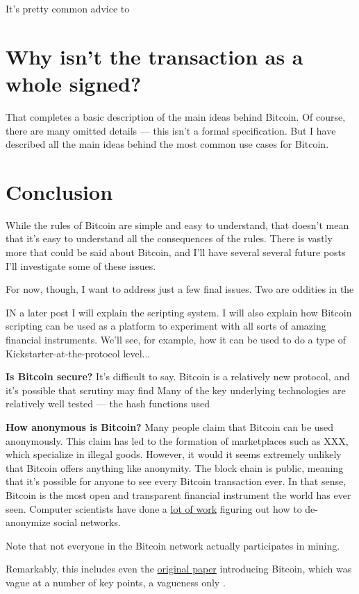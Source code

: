 \documentclass[12pt]{book}
\newcommand{\link}[2]{\href{#1}{#2}}
\newcounter{example}[chapter]
\begin{document}
It's pretty common advice to  

\section{Why isn't the transaction as a whole signed?}


That completes a basic description of the main ideas behind Bitcoin.
Of course, there are many omitted details --- this isn't a formal
specification.  But I have described all the main ideas behind the
most common use cases for Bitcoin.

\section{Conclusion}

While the rules of Bitcoin are simple and easy to understand, that
doesn't mean that it's easy to understand all the consequences of the
rules.  There is vastly more that could be said about Bitcoin, and
I'll have several several future posts I'll investigate some of these
issues.

For now, though, I want to address just a few final issues.  Two are
oddities in the 

IN a later post I will explain the scripting system.  I will also
explain how Bitcoin scripting can be used as a platform to experiment
with all sorts of amazing financial instruments.  We'll see, for
example, how it can be used to do a type of
Kickstarter-at-the-protocol level...

\textbf{Is Bitcoin secure?}  It's difficult to say.  Bitcoin is a
relatively new protocol, and it's possible that scrutiny may find Many
of the key underlying technologies are relatively well tested --- the
hash functions used

\textbf{How anonymous is Bitcoin?} Many people claim that Bitcoin can
be used anonymously.  This claim has led to the formation of
marketplaces such as XXX, which specialize in illegal goods.  However,
it would it seems extremely unlikely that Bitcoin offers anything like
anonymity.  The block chain is public, meaning that it's possible for
anyone to see every Bitcoin transaction ever.  In that sense, Bitcoin
is the most open and transparent financial instrument the world has
ever seen.  Computer scientists have done a
\link{http://scholar.google.com/scholar?q=de-anonymization}{lot of
  work} figuring out how to de-anonymize social networks.





Note that not everyone in the Bitcoin network actually participates in
mining.


Remarkably, this includes even the
\link{http://bitcoin.org/bitcoin.pdf}{original paper} introducing
Bitcoin, which was vague at a number of key points, a vagueness only .
\end{document}

